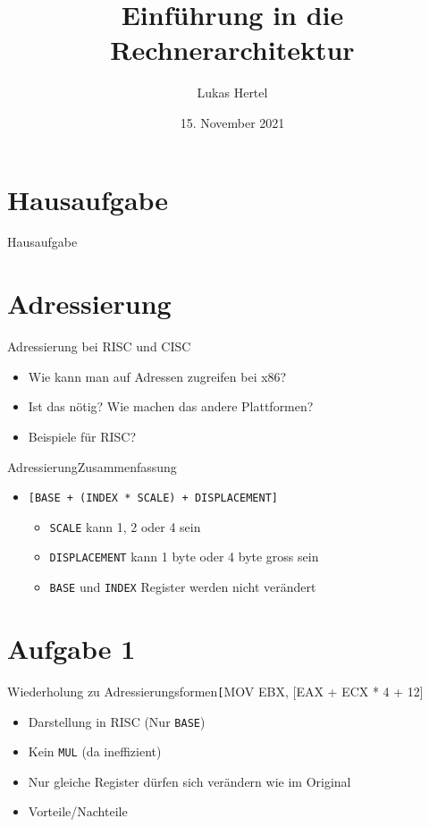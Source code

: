 \documentclass[
  german,            %
  aspectratio=169,    %
  sectionpage=false,   %
]{tumbeamer}
\title{Einführung in die Rechnerarchitektur}
\subtitle{}
\author{Lukas Hertel}
\institute{\theChairName\\\theDepartmentName\\\theUniversityName}
\date[15.11.2021]{15. November 2021}
\begin{document}
\maketitle

\section{Hausaufgabe}
\begin{frame}{Hausaufgabe}
	
\end{frame}
\section{Adressierung}
\begin{frame}{Adressierung bei RISC und CISC}
    \begin{itemize}
        \item Wie kann man auf Adressen zugreifen bei x86?
        \item Ist das nötig? Wie machen das andere Plattformen?
        \item Beispiele für RISC?
    \end{itemize}
\end{frame}
\begin{frame}{Adressierung}{Zusammenfassung}
    \begin{itemize}
        \item \texttt{[BASE + (INDEX * SCALE) + DISPLACEMENT]}
        \begin{itemize}
            \item \texttt{SCALE} kann 1, 2 oder 4 sein
            \item \texttt{DISPLACEMENT} kann 1 byte oder 4 byte gross sein
            \item \texttt{BASE} und \texttt{INDEX} Register werden nicht verändert
        \end{itemize}
    \end{itemize}
\end{frame}
\section{Aufgabe 1}
\begin{frame}{Wiederholung zu Adressierungsformen}{\texttt[MOV EBX, [EAX + ECX * 4 + 12]}
    \begin{itemize}
        \item Darstellung in RISC (Nur \texttt{BASE})
        \item Kein \texttt{MUL} (da ineffizient)
        \item Nur gleiche Register dürfen sich verändern wie im Original
        \item Vorteile/Nachteile
    \end{itemize}
\end{frame}
\end{document}
